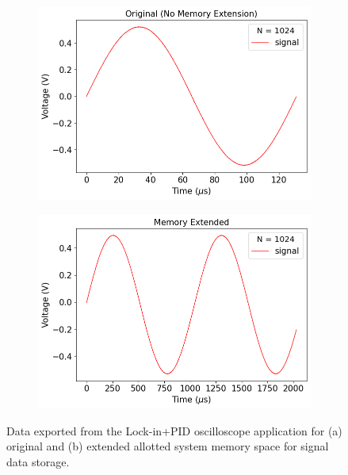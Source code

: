 \begin{figure}[ht]
    \centering
    \begin{subfigure}[t]{0.47\linewidth}
        \centering
        \includegraphics[width=\textwidth]{images/chapter_2/2_li_pid/original.png}
        \caption{}
        \label{fig:ch2_lipid_og}
    \end{subfigure}
    \hspace{.025\linewidth}
    \begin{subfigure}[t]{0.47\linewidth}
        \centering
        \includegraphics[width=\textwidth]{images/chapter_2/2_li_pid/extended.png}
        \caption{}
        \label{fig:ch2_lipid_ex}
    \end{subfigure}
    \caption{Data exported from the Lock-in+PID oscilloscope application for (a) original and (b) extended allotted system memory space for signal data storage.}
    \label{fig:ch2_lipid}
\end{figure}